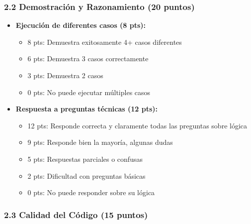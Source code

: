 \documentclass[12pt,a4paper]{article}
\begin{document}
\subsubsection{2.2 Demostración y Razonamiento (20 puntos)}

\begin{itemize}[leftmargin=*]
    \item \textbf{Ejecución de diferentes casos (8 pts):}
    \begin{itemize}
        \item 8 pts: Demuestra exitosamente 4+ casos diferentes
        \item 6 pts: Demuestra 3 casos correctamente
        \item 3 pts: Demuestra 2 casos
        \item 0 pts: No puede ejecutar múltiples casos
    \end{itemize}
    
    \item \textbf{Respuesta a preguntas técnicas (12 pts):}
    \begin{itemize}
        \item 12 pts: Responde correcta y claramente todas las preguntas sobre lógica
        \item 9 pts: Responde bien la mayoría, algunas dudas
        \item 5 pts: Respuestas parciales o confusas
        \item 2 pts: Dificultad con preguntas básicas
        \item 0 pts: No puede responder sobre su lógica
    \end{itemize}
\end{itemize}

\subsubsection{2.3 Calidad del Código (15 puntos)}
\end{document}
